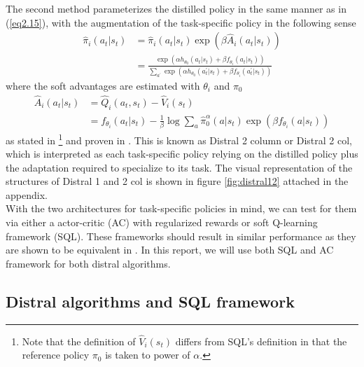 \documentclass[12pt]{report}
\begin{document}
The second method parameterizes the distilled policy in the same manner as in (\ref{eq2.15}), with the augmentation of the task-specific policy in the following sense
\begin{align}
    \hat{\pi}_i(a_t|s_t) &= \hat{\pi}_i(a_t|s_t) \exp{(\beta\hat{A}_i(a_t|s_t))}\\
    &= \frac{\exp{(\alpha h_{\theta_0}(a_t|s_t) + \beta f_{\theta_i}(a_t|s_t))}}{\sum_{a^\prime}\exp{\left(\alpha h_{\theta_0}(a^\prime_t|s_t) + \beta f_{\theta_i}(a^\prime_t|s_t)\right)}} \label{eq:logit2}
\end{align}
where the soft advantages are estimated with $\theta_i$ and $\pi_0$
\begin{align}
    \hat{A}_i(a_t|s_t) &= \hat{Q}_i(a_t,s_t) - \hat{V}_i(s_t) \nonumber\\
    &= f_{\theta_i}(a_t|s_t) - \frac{1}{\beta}\log \sum_a \hat{\pi}_0^\alpha(a|s_t)\exp{(\beta f_{\theta_i}(a|s_t))} \label{eq:distral-SQL-V}
\end{align}
as stated in \cite{teh2017distral}\footnote{Note that the definition of $\hat{V}_i(s_t)$ differs from SQL's definition in that the reference policy $\pi_0$ is taken to power of $\alpha$.} and proven in \cite{rawlik2013stochastic} \cite{fox2015taming} \cite{nachum2017bridging}. This is known as Distral 2 column or Distral 2 col, which is interpreted as each task-specific policy relying on the distilled policy plus the adaptation required to specialize to its task. The visual representation of the structures of Distral 1 and 2 col is shown in figure \ref{fig:distral12} attached in the appendix.\\

With the two architectures for task-specific policies in mind, we can test for them via either a actor-critic (AC) with regularized rewards or soft Q-learning framework (SQL). These frameworks should result in similar performance as they are shown to be equivalent in \cite{schulman2017equivalence}. In this report, we will use both SQL and AC framework for both distral algorithms.

\subsection{Distral algorithms and SQL framework}

\end{document}
